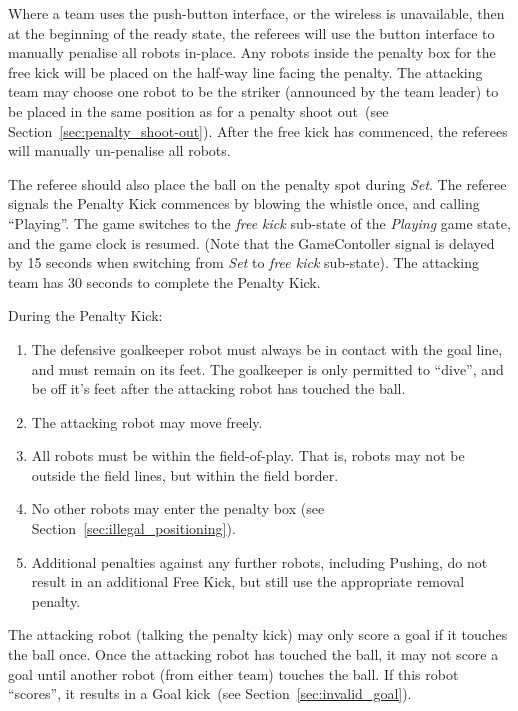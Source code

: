 \documentclass[12pt]{article}
\newcommand{\cf}{see\xspace}
\newcommand{\PlayingDelayTime}{15 seconds\xspace}
\newcommand{\PenaltyFreeKickTime}{30 seconds\xspace}
\begin{document}
Where a team uses the push-button interface, or the wireless is unavailable, then at the beginning of the ready state, the referees will use the button interface to manually penalise all robots in-place.
Any robots inside the penalty box for the free kick will be placed on the half-way line facing the penalty.
The attacking team may choose one robot to be the striker (announced by the team leader) to be placed in the same position as for a penalty shoot out~(\cf Section~\ref{sec:penalty_shoot-out}).
After the free kick has commenced, the referees will manually un-penalise all robots.

The referee should also place the ball on the penalty spot during \textit{Set}.
The referee signals the Penalty Kick commences by blowing the whistle once, and calling ``Playing''.
The game switches to the \textit{free kick} sub-state of the \textit{Playing} game state, and the game clock is resumed.
(Note that the GameContoller signal is delayed by \PlayingDelayTime when switching from \textit{Set} to \textit{free kick} sub-state).
The attacking team has \PenaltyFreeKickTime to complete the Penalty Kick.

During the Penalty Kick:
\begin{enumerate}
    \item The defensive goalkeeper robot must always be in contact with the goal line, and must remain on its feet. The goalkeeper is only permitted to ``dive'', and be off it's feet after the attacking robot has touched the ball.
    \item The attacking robot may move freely.
    \item All robots must be within the field-of-play. That is, robots may not be outside the field lines, but within the field border.
    \item No other robots may enter the penalty box (\cf Section~\ref{sec:illegal_positioning}).
    \item Additional penalties against any further robots, including Pushing, do not result in an additional Free
    Kick, but still use the appropriate removal penalty.
\end{enumerate}

The attacking robot (talking the penalty kick) may only score a goal if it touches the ball once.
Once the attacking robot has touched the ball, it may not score a goal until another robot (from either team) touches the ball.
If this robot ``scores'', it results in a Goal kick~(\cf Section~\ref{sec:invalid_goal}).
\end{document}
